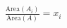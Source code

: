 \documentclass[preview]{standalone}
\begin{document}
\begin{align*}
\frac{\text{Area}(A_i)}{\text{Area}(A)} = x_i
\end{align*}
\end{document}
